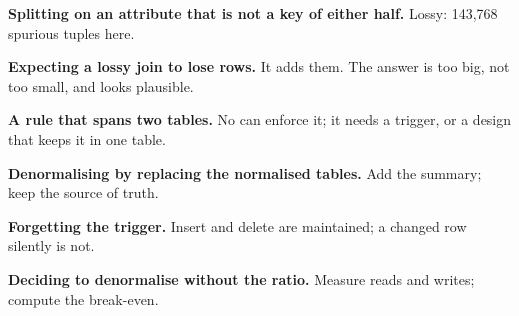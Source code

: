 \begin{pitfall}
\begin{tight}
  \item \textbf{Splitting on an attribute that is not a key of either half.}
        Lossy: 143{,}768 spurious tuples here.
  \item \textbf{Expecting a lossy join to lose rows.} It adds them. The answer
        is too big, not too small, and looks plausible.
  \item \textbf{A rule that spans two tables.} No  can enforce
        it; it needs a trigger, or a design that keeps it in one table.
  \item \textbf{Denormalising by replacing the normalised tables.} Add the
        summary; keep the source of truth.
  \item \textbf{Forgetting the  trigger.} Insert and delete are
        maintained; a changed row silently is not.
  \item \textbf{Deciding to denormalise without the ratio.} Measure reads and
        writes; compute the break-even.
\end{tight}
\end{pitfall}

